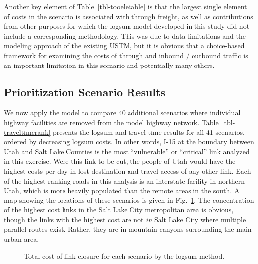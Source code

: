 \documentclass[]{ascelike-new}
\begin{document}
Another key element of Table~\ref{tbl-tooeletable} is that the largest
single element of costs in the scenario is associated with through
freight, as well as contributions from other purposes for which the
logsum model developed in this study did not include a corresponding
methodology. This was due to data limitations and the modeling approach
of the existing USTM, but it is obvious that a choice-based framework
for examining the costs of through and inbound / outbound traffic is an
important limitation in this scenario and potentially many others.

\subsection{Prioritization Scenario
Results}\label{prioritization-scenario-results}

We now apply the model to compare 40 additional scenarios where
individual highway facilities are removed from the model highway
network. Table~\ref{tbl-traveltimerank} presents the logsum and travel
time results for all 41 scenarios, ordered by decreasing logsum costs.
In other words, I-15 at the boundary between Utah and Salt Lake Counties
is the most ``vulnerable'' or ``critical'' link analyzed in this
exercise. Were this link to be cut, the people of Utah would have the
highest costs per day in lost destination and travel access of any other
link. Each of the highest-ranking roads in this analysis is an
interstate facility in northern Utah, which is more heavily populated
than the remote areas in the south. A map showing the locations of these
scenarios is given in Fig.~\ref{fig-linksmap}. The concentration of the
highest cost links in the Salt Lake City metropolitan area is obvious,
though the links with the highest cost are not \emph{in} Salt Lake City
where multiple parallel routes exist. Rather, they are in mountain
canyons surrounding the main urban area.

\begin{figure}

\begin{minipage}{0.50\linewidth}



\end{minipage}%
%
\begin{minipage}{0.50\linewidth}



\end{minipage}%

\caption{\label{fig-linksmap}Total cost of link closure for each
scenario by the logsum method.}

\end{figure}%
\end{document}
